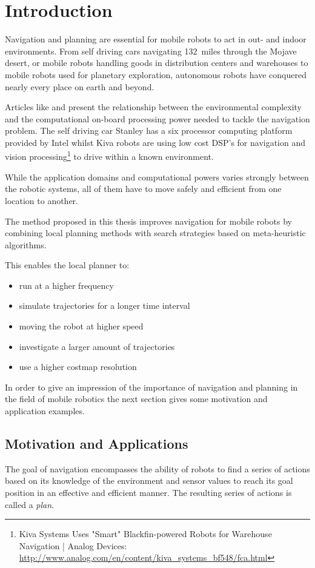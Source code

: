 \chapter{Introduction}\label{ch:introduction}
Navigation and planning are essential for mobile robots to act in out- and indoor environments. 
From self driving cars navigating 132~miles through the Mojave desert, or mobile robots handling goods in distribution centers and warehouses to mobile robots used for planetary exploration, autonomous robots have conquered nearly every place on earth and beyond.
 
Articles like \cite{stanley} and \cite{kiva} present the relationship between the environmental complexity and the computational on-board processing power needed to tackle the navigation problem.
The self driving car Stanley has a six processor computing platform provided by Intel whilst Kiva robots are using low cost DSP's for navigation and vision processing\footnote{Kiva Systems Uses "Smart" Blackfin-powered Robots for Warehouse Navigation | Analog Devices: \url{http://www.analog.com/en/content/kiva_systems_bf548/fca.html}} to drive within a known environment.  

While the application domains and computational powers varies strongly between the robotic systems, all of them have to move safely and efficient from one location to another.   

The method proposed in this thesis improves navigation for mobile robots by combining local planning methods with search strategies based on meta-heuristic algorithms.

This enables the local planner to:
\begin{itemize}
\item run at a higher frequency
\item simulate trajectories for a longer time interval
\item moving the robot at higher speed
\item investigate a larger amount of trajectories
\item use a higher costmap resolution
\end{itemize}

In order to give an impression of the importance of navigation and planning in the field of mobile robotics the next section gives some motivation and application examples.

\section{Motivation and Applications}\label{sec:motivation} 
The goal of navigation encompasses the ability of robots to find a series of actions based on its knowledge of the environment and sensor values to reach its goal position in an effective and efficient manner.
The resulting series of actions is called a \emph{plan}. 

